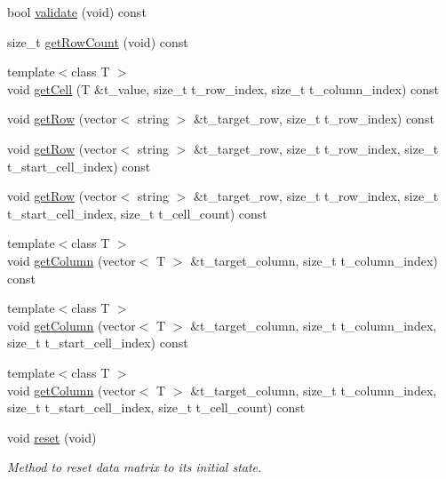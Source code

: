 \begin{DoxyCompactItemize}
\item 
bool \hyperlink{classutils_1_1SlightMatrix_a536e733a179ee3eaeb5c75986cc477d3}{validate} (void) const
\item 
size\+\_\+t \hyperlink{classutils_1_1SlightMatrix_af171e463492b423251369cd7b8799a97}{get\+Row\+Count} (void) const
\item 
{\footnotesize template$<$class T $>$ }\\void \hyperlink{classutils_1_1SlightMatrix_ac6757baf9bab12a6a92dae96015e39a1}{get\+Cell} (T \&t\+\_\+value, size\+\_\+t t\+\_\+row\+\_\+index, size\+\_\+t t\+\_\+column\+\_\+index) const
\item 
void \hyperlink{classutils_1_1SlightMatrix_ad236d7e2d1991624d221f0e077f4356e}{get\+Row} (vector$<$ string $>$ \&t\+\_\+target\+\_\+row, size\+\_\+t t\+\_\+row\+\_\+index) const
\item 
void \hyperlink{classutils_1_1SlightMatrix_a180518083776f29f5796ad67e788f9fa}{get\+Row} (vector$<$ string $>$ \&t\+\_\+target\+\_\+row, size\+\_\+t t\+\_\+row\+\_\+index, size\+\_\+t t\+\_\+start\+\_\+cell\+\_\+index) const
\item 
void \hyperlink{classutils_1_1SlightMatrix_ada228ea3f65e143162ee51437c6bffa1}{get\+Row} (vector$<$ string $>$ \&t\+\_\+target\+\_\+row, size\+\_\+t t\+\_\+row\+\_\+index, size\+\_\+t t\+\_\+start\+\_\+cell\+\_\+index, size\+\_\+t t\+\_\+cell\+\_\+count) const
\item 
{\footnotesize template$<$class T $>$ }\\void \hyperlink{classutils_1_1SlightMatrix_a66ed3d47be2a408a4f2fc0bcbb0d53f5}{get\+Column} (vector$<$ T $>$ \&t\+\_\+target\+\_\+column, size\+\_\+t t\+\_\+column\+\_\+index) const
\item 
{\footnotesize template$<$class T $>$ }\\void \hyperlink{classutils_1_1SlightMatrix_a641588a2717602d141001e05ed10ea0c}{get\+Column} (vector$<$ T $>$ \&t\+\_\+target\+\_\+column, size\+\_\+t t\+\_\+column\+\_\+index, size\+\_\+t t\+\_\+start\+\_\+cell\+\_\+index) const
\item 
{\footnotesize template$<$class T $>$ }\\void \hyperlink{classutils_1_1SlightMatrix_a4257bae1614d59a9f94afe6b12ce7ef7}{get\+Column} (vector$<$ T $>$ \&t\+\_\+target\+\_\+column, size\+\_\+t t\+\_\+column\+\_\+index, size\+\_\+t t\+\_\+start\+\_\+cell\+\_\+index, size\+\_\+t t\+\_\+cell\+\_\+count) const
\item 
\mbox{\label{classutils_1_1SlightMatrix_a9fa5e54d8c43cc967596f708a37aab50}} 
void \hyperlink{classutils_1_1SlightMatrix_a9fa5e54d8c43cc967596f708a37aab50}{reset} (void)
\begin{DoxyCompactList}\small\item\em Method to reset data matrix to its initial state. \end{DoxyCompactList}\end{DoxyCompactItemize}


